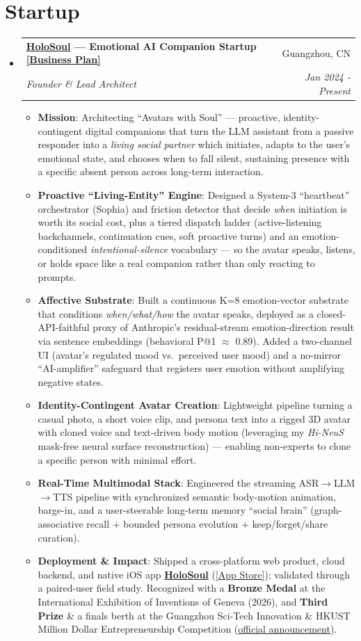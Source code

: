 \documentclass[letterpaper,10.8pt]{article}
\makeatletter
\newcommand{\resumeItem}[2]{
  \item\small{
    \textbf{#1}{: #2 \vspace{-2pt}}
  }
}
\newcommand{\resumeSubheading}[4]{
  \vspace{-1pt}\item
    \begin{tabular*}{0.97\textwidth}{l@{\extracolsep{\fill}}r}
      \textbf{#1} & #2 \\
      \textit{\small#3} & \textit{\small #4} \\
    \end{tabular*}\vspace{-5pt}
}
\newcommand{\resumeSubHeadingListStart}{\begin{itemize}[leftmargin=*]}
\newcommand{\resumeSubHeadingListEnd}{\end{itemize}}
\newcommand{\resumeItemListStart}{\begin{itemize}}
\newcommand{\resumeItemListEnd}{\end{itemize}\vspace{-5pt}}
\makeatother
\begin{document}
\section{Startup}
  \resumeSubHeadingListStart
  \resumeSubheading
    {\href{https://holosoul.cn/}{HoloSoul} --- Emotional AI Companion Startup \href{https://drive.google.com/file/d/1fbauPwSvxVdfW163s7A6V_wBo7LNIRLm/view?usp=sharing}{[Business Plan]}}{Guangzhou, CN}
    {Founder \& Lead Architect}{Jan 2024 - Present}
    \resumeItemListStart
        \resumeItem{Mission} {Architecting ``Avatars with Soul'' --- proactive, identity-contingent digital companions that turn the LLM assistant from a passive responder into a \textit{living social partner} which initiates, adapts to the user's emotional state, and chooses when to fall silent, sustaining presence with a specific absent person across long-term interaction.}
        \resumeItem{Proactive ``Living-Entity'' Engine} {Designed a System-3 ``heartbeat'' orchestrator (Sophia) and friction detector that decide \textit{when} initiation is worth its social cost, plus a tiered dispatch ladder (active-listening backchannels, continuation cues, soft proactive turns) and an emotion-conditioned \textit{intentional-silence} vocabulary --- so the avatar speaks, listens, or holds space like a real companion rather than only reacting to prompts.}
        \resumeItem{Affective Substrate} {Built a continuous K=8 emotion-vector substrate that conditions \textit{when/what/how} the avatar speaks, deployed as a closed-API-faithful proxy of Anthropic's residual-stream emotion-direction result via sentence embeddings (behavioral P@1 $\approx$ 0.89). Added a two-channel UI (avatar's regulated mood vs.\ perceived user mood) and a no-mirror ``AI-amplifier'' safeguard that registers user emotion without amplifying negative states.}
        \resumeItem{Identity-Contingent Avatar Creation} {Lightweight pipeline turning a casual photo, a short voice clip, and persona text into a rigged 3D avatar with cloned voice and text-driven body motion (leveraging my \textit{Hi-NeuS} mask-free neural surface reconstruction) --- enabling non-experts to clone a specific person with minimal effort.}
        \resumeItem{Real-Time Multimodal Stack} {Engineered the streaming ASR$\rightarrow$LLM$\rightarrow$TTS pipeline with synchronized semantic body-motion animation, barge-in, and a user-steerable long-term memory ``social brain'' (graph-associative recall + bounded persona evolution + keep/forget/share curation).}
        \resumeItem{Deployment \& Impact} {Shipped a cross-platform web product, cloud backend, and native iOS app \href{https://holosoul.cn/}{\textbf{HoloSoul}} (\href{https://apps.apple.com/us/app/id6777871257}{[App Store]}); validated through a paired-user field study. Recognized with a \textbf{Bronze Medal} at the International Exhibition of Inventions of Geneva (2026), and \textbf{Third Prize} \& a finals berth at the Guangzhou Sci-Tech Innovation \& HKUST Million Dollar Entrepreneurship Competition (\href{https://kjj.gz.gov.cn/gsxx/content/post_10524225.html}{official announcement}).}
    \resumeItemListEnd
\resumeSubHeadingListEnd
\end{document}
